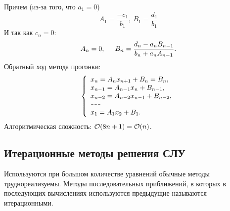\begin{multicols}{2}
\[    \]
    Причем (из-за того, что $a_1 = 0$)
    \[
        A_{1} = \dfrac{-c_1}{b_1}, \ B_1 = \dfrac{d_1}{b_1}  
    \]
    И так как $c_n = 0$:
    \[
        A_n = 0, \hspace*{0.5cm} B_n = \dfrac{d_n-a_nB_{n-1}}{b_n + a_nA_{n-1}}.  
    \]
    Обратный ход метода прогонки:
    \[
        \left\{
            \begin{array}{l}
                x_n = A_nx_{n+1} + B_n = B_n,\\
                x_{n-1} = A_{n-1}x_n + B_{n-1},\\
                x_{n-2} = A_{n-2}x_{n-1} + B_{n-2},\\
                \hdash\\
                x_1 = A_1 x_2 + B_1.
            \end{array}
        \right.  
    \]
    Алгоритмическая сложность: ${\cal O}(8n+1) = {\cal O}(n)$.
    \subsection*{Итерационные методы решения СЛУ}
    Используются при большом количестве уравнений обычные методы труднореализуемы. Методы последовательных приближений, в которых в последующих вычислениях используются предыдущие называются итерационными. 

\end{multicols}

